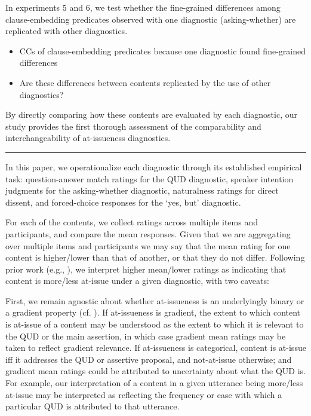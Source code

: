 \documentclass[times,linguex,xcolor]{glossa}
\begin{document}
  In experiments 5 and 6, we test whether the fine-grained differences among clause-embedding predicates observed with one diagnostic (asking-whether) are replicated with other diagnostics.
  \begin{itemize}
    \item CCs of clause-embedding predicates because one diagnostic found fine-grained differences
    \item Are these differences between contents replicated by the use of other diagnostics?
  \end{itemize}
  
  By directly comparing how these contents are evaluated by each diagnostic, our study provides the first thorough assessment of the comparability and interchangeability of at-issueness diagnostics.

  \bigskip \hrule\bigskip

  In this paper, we operationalize each diagnostic through its established empirical task: question-answer match ratings for the QUD diagnostic, speaker intention judgments for the asking-whether diagnostic, naturalness ratings for direct dissent, and forced-choice responses for the ‘yes, but’ diagnostic.

  For each of the contents, we collect ratings across multiple items and participants, and compare the mean responses. Given that we are aggregating over multiple items and participants
  we may say that the mean rating for one content is higher/lower than that of another, or that they do not differ. Following prior work (e.g., \citealt{tonhauser_how_2018}), we interpret higher mean/lower ratings as indicating that content is more/less at-issue under a given diagnostic, with two caveats:

  First, we remain agnostic about whether at-issueness is an underlyingly binary or a gradient property (cf. \citealt{tonhauser_how_2018,barnes_information_2023}). If at-issueness is gradient, the extent to which content is at-issue of a content may be understood as the extent to which it is relevant to the QUD or the main assertion, in which case gradient mean ratings may be taken to reflect gradient relevance. If at-issueness is categorical, content is at-issue iff it addresses the QUD or assertive proposal, and not-at-issue otherwise; and gradient mean ratings could be attributed to uncertainty about what the QUD is. For example, our interpretation of a content in a given utterance being more/less at-issue may be interpreted as reflecting the frequency or ease with which a particular QUD is attributed to that utterance.
\end{document}
